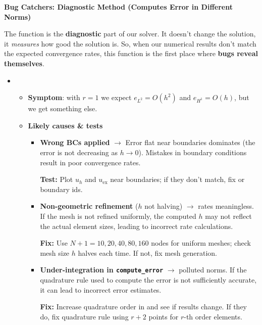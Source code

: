 \highspace
\begin{flushleft}
    \textcolor{Green3}{ \textbf{Bug Catchers: Diagnostic Method (Computes Error in Different Norms)}}
\end{flushleft}
The  function is the \textbf{diagnostic} part of our solver. It doesn't change the solution, it \emph{measures} how good the solution is. So, when our numerical results don't match the expected convergence rates, this function is the first place where \textbf{bugs reveal themselves}.
\begin{itemize}
    \item {}
    \begin{itemize}
        \item[\textcolor{Green3}{\faIcon{bug}}] \textbf{Symptom}: with $r=1$ we expect $e_{L^2} = O(h^2)$ and $e_{H^1} = O(h)$, but we get something else.
        \item[\textcolor{Green3}{\faIcon{check}}] \textbf{Likely causes \& tests}
        \begin{itemize}
            \item \textbf{Wrong BCs applied} $\to$ Error flat near boundaries dominates (the error is not decreasing as $h \to 0$). Mistakes in boundary conditions result in poor convergence rates.

            \textcolor{Green3}{ \textbf{Test:}} Plot $u_{h}$ and $u_{\text{ex}}$ near boundaries; if they don't match, fix  or boundary ids.


            \item \textbf{Non-geometric refinement} ($h$ not halving) $\to$ rates meaningless. If the mesh is not refined uniformly, the computed $h$ may not reflect the actual element sizes, leading to incorrect rate calculations.

            \textcolor{Green3}{ \textbf{Fix:}} Use $N+1 = 10, 20, 40, 80, 160$ nodes for uniform meshes; check mesh size $h$ halves each time. If not, fix mesh generation.

            
            \item \textbf{Under-integration in \texttt{compute\_error}} $\to$ polluted norms. If the quadrature rule used to compute the error is not sufficiently accurate, it can lead to incorrect error estimates.

            \textcolor{Green3}{ \textbf{Fix:}} Increase quadrature order in  and see if results change. If they do, fix quadrature rule using $r+2$ points for $r$-th order elements.



\end{itemize}
\end{itemize}
\end{itemize}
